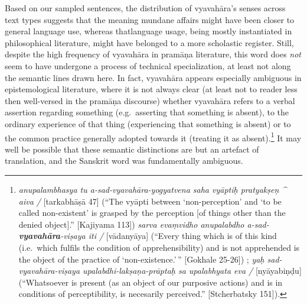 \documentclass[
  letterpaper,
  DIV=11,
  numbers=noendperiod,
  oneside]{scrreprt}
\begin{document}
Based on our sampled sentences, the distribution of vyavahāra's senses
across text types suggests that the meaning mundane affairs might have
been closer to general language use, whereas thatlanguage usage, being
mostly instantiated in philosophical literature, might have belonged to
a more scholastic register. Still, despite the high frequency of
vyavahāra in pramāṇa literature, this word does \emph{not} seem to have
undergone a process of technical specialization, at least not along the
semantic lines drawn here. In fact, vyavahāra appears especially
ambiguous in epistemological literature, where it is not always clear
(at least not to reader less then well-versed in the pramāṇa discourse)
whether vyavahāra refers to a verbal assertion regarding something
(e.g.~asserting that something is absent), to the ordinary experience of
that thing (experiencing that something is absent) or to the common
practice generally adopted towards it (treating it as
absent).\footnote{\emph{anupalambhasya tu a-sad-vyavahāra-yogyatvena
  saha vyāptiḥ pratyakṣeṇ \^{} aiva /} {[}tarkabhāṣā 47{]} (``The vyāpti
  between `non-perception' and `to be called non-existent' is grasped by
  the perception {[}of things other than the denied object{]}.''
  {[}Kajiyama 113{]}) \emph{sarva evaṃvidho anupalabdho
  a-sad-\textbf{vyavahāra}-viṣaya iti /} {[}vādanyāya{]} (``Every thing
  which is of this kind (i.e.~which fulfils the condition of
  apprehensibility) and is not apprehended is the object of the practice
  of `non-existence.'\,'' {[}Gokhale 25-26{]}) ; \emph{yaḥ
  sad-vyavahāra-viṣaya upalabdhi-lakṣaṇa-prāptaḥ sa upalabhyata eva /}
  {[}nyāyabiṇḍu{]} (``Whatsoever is present (as an object of our
  purposive actions) and is in conditions of perceptibility, is
  necesarily perceived.'' {[}Stcherbatsky 151{]}).} It may well be
possible that these semantic distinctions are but an artefact of
translation, and the Sanskrit word was fundamentally ambiguous.
\end{document}
